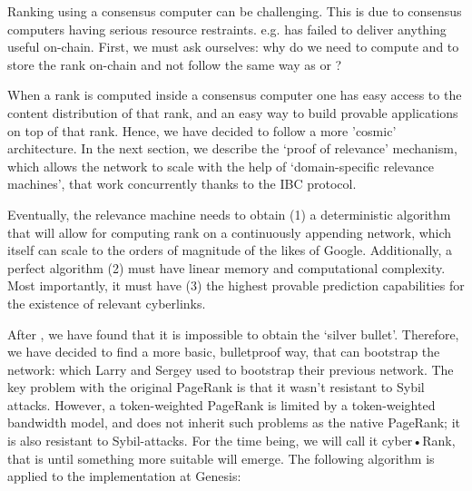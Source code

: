 \documentclass[8pt,oneside]{amsart}
\newcommand{\linkred}[2]{\href{#1}{\color{red}{#2}}}
\newcommand{\linkgreen}[2]{\href{#1}{\color{green}{#2}}}
\begin{document}
Ranking using a consensus computer can be challenging. This is due to consensus computers having serious resource restraints. e.g. \linkgreen{https://ipfs.io/ipfs/QmWTZjDZNbBqcJ5b6VhWGXBQ5EQavKKDteHsdoYqB5CBjh}{Nebulas} has failed to deliver anything useful on-chain. First, we must ask ourselves: why do we need to compute and to store the rank on-chain and not follow the same way as \linkgreen{https://ipfs.io/ipfs/QmZo7eY5UdJYotf3Z9GNVBGLjkCnE1j2fMdW2PgGCmvGPj}{Colony} or \linkgreen{https://ipfs.io/ipfs/QmTrxXp2xhB2zWGxhNoLgsztevqKLwpy5HwKjLjzFa7rnD}{Truebit}?

When a rank is computed inside a consensus computer one has easy access to the content distribution of that rank, and an easy way to build provable applications on top of that rank. Hence, we have decided to follow a more 'cosmic' architecture. In the next section, we describe the ‘proof of relevance’ mechanism, which allows the network to scale with the help of ‘domain-specific relevance machines’, that work concurrently thanks to the IBC protocol.

Eventually, the relevance machine needs to obtain (1) a deterministic algorithm that will allow for computing rank on a continuously appending network, which itself can scale to the orders of magnitude of the likes of Google. Additionally, a perfect algorithm (2) must have linear memory and computational complexity. Most importantly, it must have (3) the highest provable prediction capabilities for the existence of relevant cyberlinks.

After \linkred{https://arxiv.org/pdf/1709.09002.pdf}{some research}, we have found that it is impossible to obtain the ‘silver bullet’. Therefore, we have decided to find a more basic, bulletproof way, that can bootstrap the network: \linkred{http://ilpubs.stanford.edu:8090/422/1/1999-66.pdf}{the rank} which Larry and Sergey used to bootstrap their previous network. The key problem with the original PageRank is that it wasn't resistant to Sybil attacks. However, a token-weighted PageRank is limited by a token-weighted bandwidth model, and does not inherit such problems as the native PageRank; it is also resistant to Sybil-attacks. For the time being, we will call it cyber•Rank, that is until something more suitable will emerge. The following algorithm is applied to the implementation at Genesis:
\end{document}
